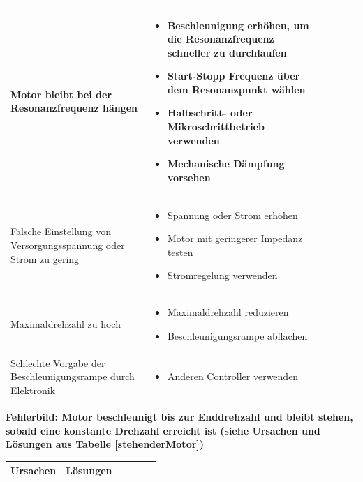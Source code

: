 {{\begin{center}
\begin{tabularx}{\textwidth}{|X|X|X|X|X|X|}
				Motor bleibt bei der Resonanzfrequenz hängen & 
				\begin{itemize} 
					\item {Beschleunigung erhöhen, um die Resonanzfrequenz schneller zu durchlaufen} 
					\item {Start-Stopp Frequenz über dem Resonanzpunkt wählen} 
					\item {Halbschritt- oder Mikroschrittbetrieb verwenden} 
					\item {Mechanische Dämpfung vorsehen} 
				\end{itemize}	 \\	\hline
				Falsche Einstellung von Versorgungsspannung oder Strom zu gering & 
				\begin{itemize}
					\item {Spannung oder Strom erhöhen} 
					\item {Motor mit geringerer Impedanz testen} 
					\item {Stromregelung verwenden}
				\end{itemize}\\	\hline
				Maximaldrehzahl zu hoch & 
				\begin{itemize}
					\item {Maximaldrehzahl reduzieren} 
					\item {Beschleunigungsrampe abflachen}
				\end{itemize}\\ \hline
				Schlechte Vorgabe der Beschleunigungsrampe durch Elektronik & 
				\begin{itemize}
					\item {Anderen Controller verwenden }
				\end{itemize}\\ \hline
			\end{tabularx}
			\label{Beschleunigungsrampe}	
		\end{center}
		
		{\textbf{Fehlerbild: Motor beschleunigt bis zur Enddrehzahl und bleibt stehen, sobald eine konstante Drehzahl erreicht ist (siehe Ursachen und Lösungen aus Tabelle \ref{stehenderMotor})}
			\begin{center}
				\fontsize{8}{10}\selectfont
				\begin{tabularx}{\textwidth}{|X|X|X|X|X|X|}
					\hline 
					\textbf{Ursachen} & \textbf{Lösungen} \\ \hline
					

\end{tabularx}
\end{center}}}}
